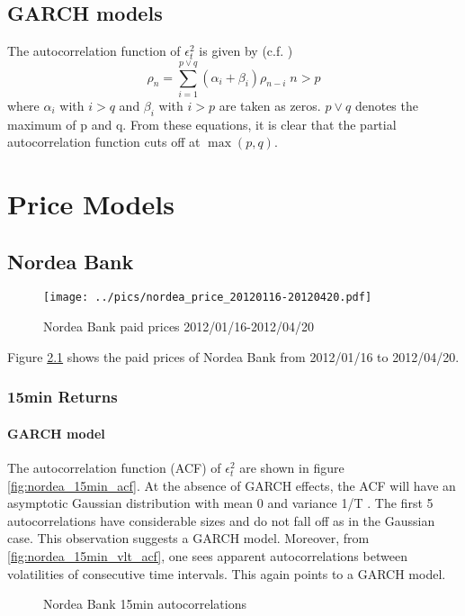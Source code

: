 \documentclass{book}
\begin{document}
\section{GARCH models}
The autocorrelation function of $\epsilon_t^2$ is given by
(c.f. \cite{Bollerslev87})
$$
\rho_n = \sum_{i=1}^{p \vee q} (\alpha_i + \beta_i) \rho_{n-i}
\;n > p
$$
where $\alpha_i$ with $i > q$ and $\beta_i$ with $i > p$ are taken as
zeros. $p \vee q$ denotes the maximum of p and q. From these
equations, it is clear that the partial autocorrelation function cuts
off at $\max(p, q)$.

\chapter{Price Models}
\section{Nordea Bank}
\begin{figure}[htb!]
  \centering
  \texttt{[image: ../pics/nordea\_price\_20120116-20120420.pdf]}
  \caption{\footnotesize Nordea Bank paid prices 2012/01/16-2012/04/20}
  \label{fig:Nordea}
\end{figure}
Figure \ref{fig:Nordea} shows the paid prices of Nordea Bank from
2012/01/16 to 2012/04/20.

\subsection{15min Returns}
\subsubsection{GARCH model}
The autocorrelation function (ACF) of $\epsilon_t^2$ are shown in figure
\ref{fig:nordea_15min_acf}. At the absence of GARCH effects, the ACF
will have an asymptotic Gaussian distribution with mean 0 and variance
1/T \cite{Bollerslev86, Bollerslev87}. The first 5 autocorrelations
have considerable sizes and do not fall off as in the Gaussian
case. This observation suggests a GARCH model. Moreover, from
\ref{fig:nordea_15min_vlt_acf}, one sees apparent autocorrelations
between volatilities of consecutive time intervals. This again points
to a GARCH model.
\begin{figure}[htb!]
  \centering
  \caption{\footnotesize Nordea Bank 15min autocorrelations}
\end{figure}
\end{document}

